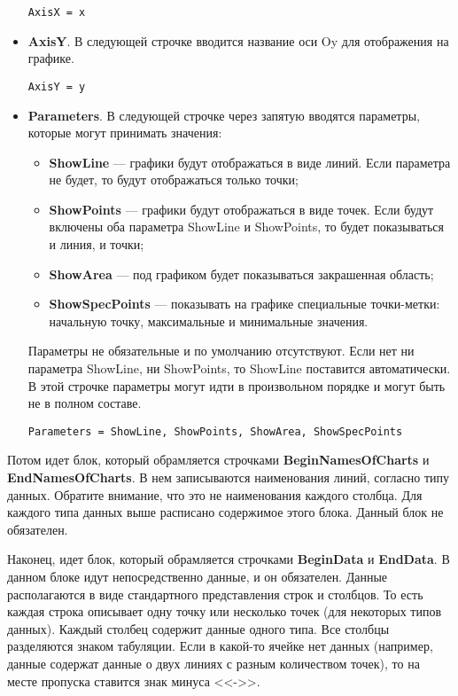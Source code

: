 \documentclass[a4paper,12pt]{article}
\begin{document}
\begin{itemize}
\begin{lstlisting}[label=Line04,caption=Название оси Ox]
AxisX = x
\end{lstlisting}

\item \textbf{AxisY}.
В следующей строчке вводится название оси Oy для отображения на графике.

\begin{lstlisting}[label=Line04,caption=Название оси Oy]
AxisY = y
\end{lstlisting}

\item \textbf{Parameters}.
В следующей строчке через запятую вводятся параметры, которые могут принимать значения:

\begin{itemize}
\item \textbf{ShowLine} --- графики будут отображаться в виде линий. Если параметра не будет, то будут отображаться только точки;
\item \textbf{ShowPoints} --- графики будут отображаться в виде точек. Если будут включены оба параметра ShowLine и ShowPoints, то будет показываться и линия, и точки;
\item \textbf{ShowArea} --- под графиком будет показываться закрашенная область;
\item \textbf{ShowSpecPoints} --- показывать на графике специальные точки-метки: начальную точку, максимальные и минимальные значения.
\end{itemize}

Параметры не обязательные и по умолчанию отсутствуют. Если нет ни параметра ShowLine, ни ShowPoints, то ShowLine поставится автоматически. В этой строчке параметры могут идти в произвольном порядке и могут быть не в полном составе.

\begin{lstlisting}[label=Line04,caption=Строка параметров]
Parameters = ShowLine, ShowPoints, ShowArea, ShowSpecPoints
\end{lstlisting}

\end{itemize}

Потом идет блок, который обрамляется строчками \textbf{BeginNamesOfCharts} и \textbf{EndNamesOfCharts}. В нем записываются наименования линий, согласно типу данных. Обратите внимание, что это не наименования каждого столбца. Для каждого типа данных выше расписано содержимое этого блока. Данный блок не обязателен.

Наконец, идет блок, который обрамляется строчками \textbf{BeginData} и \textbf{EndData}. В данном блоке идут непосредственно данные, и он обязателен. Данные располагаются в виде стандартного представления строк и столбцов. То есть каждая строка описывает одну точку или несколько точек (для некоторых типов данных). Каждый столбец содержит данные одного типа. Все столбцы разделяются знаком табуляции. Если в какой-то ячейке нет данных (например, данные содержат данные о двух линиях с разным количеством точек), то на месте пропуска ставится знак минуса <<->>.
\end{document}
